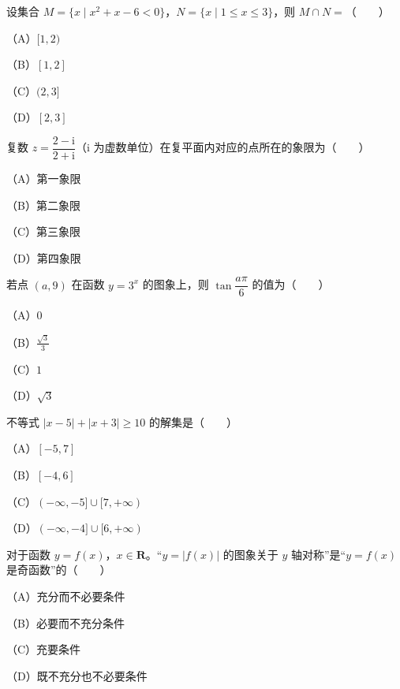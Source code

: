

\begin{question}
设集合 $M=\{x\mid x^2+x-6<0\}$，$N=\{x\mid 1\leqslant x\leqslant 3\}$，则 $M\cap N=$\mbox{（　　）}

（A）$[1,2)$

（B）$[1,2]$

（C）$(2,3]$

（D）$[2,3]$

\end{question}
\begin{question}
复数 $z=\dfrac{2-\mathrm i}{2+\mathrm i}$（$\mathrm i$ 为虚数单位）在复平面内对应的点所在的象限为\mbox{（　　）}

（A）第一象限

（B）第二象限

（C）第三象限

（D）第四象限

\end{question}
\begin{question}
若点 $(a,9)$ 在函数 $y=3^x$ 的图象上，则 $\tan\dfrac{a\pi}{6}$ 的值为\mbox{（　　）}

（A）$0$

（B）$\frac{\sqrt3}{3}$

（C）$1$

（D）$\sqrt3$

\end{question}
\begin{question}
不等式 $|x-5|+|x+3|\geqslant10$ 的解集是\mbox{（　　）}

（A）$[-5,7]$

（B）$[-4,6]$

（C）$(-\infty,-5]\cup[7,+\infty)$

（D）$(-\infty,-4]\cup[6,+\infty)$

\end{question}
\begin{question}
对于函数 $y=f(x)$，$x\in\mathbf R$。“$y=|f(x)|$ 的图象关于 $y$ 轴对称”是“$y=f(x)$ 是奇函数”的\mbox{（　　）}

（A）充分而不必要条件

（B）必要而不充分条件

（C）充要条件

（D）既不充分也不必要条件

\end{question}
